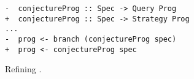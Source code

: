 \begin{wrapfigure}{r}{0.52\textwidth}
\vspace{-0.95em}
\begin{ccodebox}
\begin{lstlisting}[style=haskellDiff]
-  conjectureProg :: Spec -> Query Prog
+  conjectureProg :: Spec -> Strategy Prog
...
-  prog <- branch (conjectureProg spec)
+  prog <- conjectureProg spec
\end{lstlisting}
\end{ccodebox}
\vspace{-1.3em}
\caption{Refining .}\label{fig:refine-write-program}
\vspace{-0.7em}
\end{wrapfigure}
